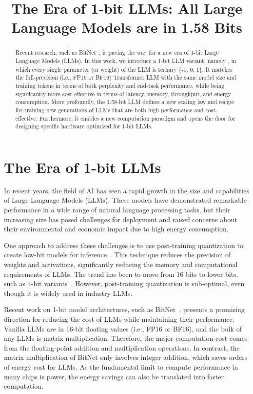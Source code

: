 \title{The Era of 1-bit LLMs: All Large Language Models are in 1.58 Bits}

\begin{abstract}
Recent research, such as BitNet~\cite{bitnet}, is paving the way for a new era of 1-bit Large Language Models (LLMs). In this work, we introduce a 1-bit LLM variant, namely \textbf{}, in which every single parameter (or weight) of the LLM is ternary \{-1, 0, 1\}. It matches the full-precision (i.e., FP16 or BF16) Transformer LLM with the same model size and training tokens in terms of both perplexity and end-task performance, while being significantly more cost-effective in terms of latency, memory, throughput, and energy consumption. More profoundly, the 1.58-bit LLM defines a new scaling law and recipe for training new generations of LLMs that are both high-performance and cost-effective. Furthermore, it enables a new computation paradigm and opens the door for designing specific hardware optimized for 1-bit LLMs.
\end{abstract}

\section{The Era of 1-bit LLMs}

In recent years, the field of AI has seen a rapid growth in the size and capabilities of Large Language Models (LLMs). These models have demonstrated remarkable performance in a wide range of natural language processing tasks, but their increasing size has posed challenges for deployment and raised concerns about their environmental and economic impact due to high energy consumption. 

One approach to address these challenges is to use post-training quantization to create low-bit models for inference~\cite{smoothquant, gptq, quip, quip_sharp}. This technique reduces the precision of weights and activations, significantly reducing the memory and computational requirements of LLMs. The trend has been to move from 16 bits to lower bits, such as 4-bit variants~\cite{gptq, awq}. However, post-training quantization is sub-optimal, even though it is widely used in industry LLMs.

Recent work on 1-bit model architectures, such as BitNet~\cite{bitnet}, presents a promising direction for reducing the cost of LLMs while maintaining their performance. Vanilla LLMs are in 16-bit floating values (i.e., FP16 or BF16), and the bulk of any LLMs is matrix multiplication. Therefore, the major computation cost comes from the floating-point addition and multiplication operations. In contrast, the matrix multiplication of BitNet only involves integer addition, which saves orders of energy cost for LLMs. As the fundamental limit to compute performance in many chips is power, the energy savings can also be translated into faster computation.


